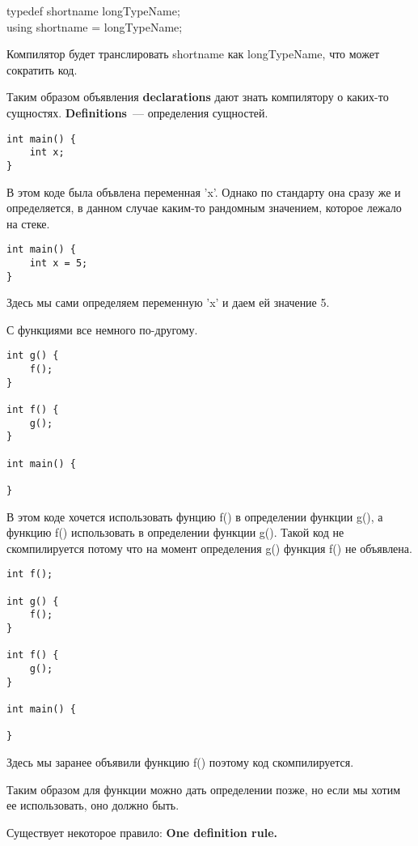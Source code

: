 \begin{center}
typedef shortname longTypeName; \\
using shortname = longTypeName;
\end{center}

Компилятор будет транслировать shortname как longTypeName, что может сократить код.

Таким образом объявления \textbf{declarations} дают знать компилятору о каких-то сущностях.
\textbf{Definitions}~--- определения сущностей.

\begin{verbatim}
int main() {
    int x;
}
\end{verbatim}

В этом коде была объвлена переменная 'x'. Однако по стандарту она сразу же и определяется, в данном случае каким-то рандомным значением, которое лежало на стеке.

\begin{verbatim}
int main() {
    int x = 5;
}
\end{verbatim}

Здесь мы сами определяем переменную 'x' и даем ей значение 5.

С функциями все немного по-другому.

\begin{verbatim}
int g() {
    f();
}

int f() {
    g();
}

int main() {

}
\end{verbatim}

В этом коде хочется использовать фунцию f() в определении функции g(), 
а функцию f() использовать в определении функции g(). Такой код не скомпилируется потому что на момент определения g() функция f() не объявлена.

\begin{verbatim}
int f();

int g() {
    f();
}

int f() {
    g();
}

int main() {

}
\end{verbatim}

Здесь мы заранее объявили функцию f() поэтому код скомпилируется.

Таким образом для функции можно дать определении позже, но если мы хотим ее использовать, оно должно быть.

Существует некоторое правило: \textbf{One definition rule.}

